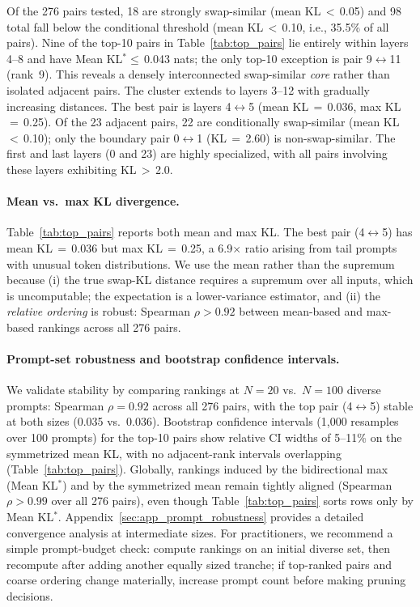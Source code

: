 \documentclass{article}
\begin{document}
Of the 276 pairs tested, 18 are strongly swap-similar (mean KL\,$<$\,0.05) and 98 total fall below the conditional threshold (mean KL\,$<$\,0.10, i.e., 35.5\% of all pairs). Nine of the top-10 pairs in Table~\ref{tab:top_pairs} lie entirely within layers 4--8 and have Mean KL$^*$$\leq$\,0.043 nats; the only top-10 exception is pair 9$\leftrightarrow$11 (rank~9). This reveals a densely interconnected swap-similar \emph{core} rather than isolated adjacent pairs. The cluster extends to layers 3--12 with gradually increasing distances. The best pair is layers 4$\leftrightarrow$5 (mean KL\,$=$\,0.036, max KL\,$=$\,0.25). Of the 23 adjacent pairs, 22 are conditionally swap-similar (mean KL\,$<$\,0.10); only the boundary pair 0$\leftrightarrow$1 (KL\,$=$\,2.60) is non-swap-similar. The first and last layers (0 and 23) are highly specialized, with all pairs involving these layers exhibiting KL\,$>$\,2.0.

\paragraph{Mean vs.\ max KL divergence.}
Table~\ref{tab:top_pairs} reports both mean and max KL. The best pair (4$\leftrightarrow$5) has mean KL\,$=$\,0.036 but max KL\,$=$\,0.25, a 6.9$\times$ ratio arising from tail prompts with unusual token distributions. We use the mean rather than the supremum because (i) the true swap-KL distance requires a supremum over all inputs, which is uncomputable; the expectation is a lower-variance estimator, and (ii) the \emph{relative ordering} is robust: Spearman $\rho > 0.92$ between mean-based and max-based rankings across all 276 pairs.

\paragraph{Prompt-set robustness and bootstrap confidence intervals.} We validate stability by comparing rankings at $N{=}20$ vs.\ $N{=}100$ diverse prompts: Spearman $\rho = 0.92$ across all 276 pairs, with the top pair (4$\leftrightarrow$5) stable at both sizes (0.035 vs.\ 0.036). Bootstrap confidence intervals (1{,}000 resamples over 100 prompts) for the top-10 pairs show relative CI widths of 5--11\% on the symmetrized mean KL, with no adjacent-rank intervals overlapping (Table~\ref{tab:top_pairs}). Globally, rankings induced by the bidirectional max (Mean KL$^*$) and by the symmetrized mean remain tightly aligned (Spearman $\rho > 0.99$ over all 276 pairs), even though Table~\ref{tab:top_pairs} sorts rows only by Mean KL$^*$. Appendix~\ref{sec:app_prompt_robustness} provides a detailed convergence analysis at intermediate sizes. For practitioners, we recommend a simple prompt-budget check: compute rankings on an initial diverse set, then recompute after adding another equally sized tranche; if top-ranked pairs and coarse ordering change materially, increase prompt count before making pruning decisions.
\end{document}
